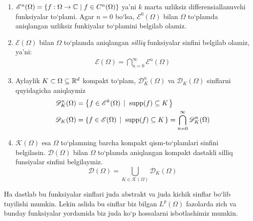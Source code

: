 \begin{enumerate}[label=\textnormal(\emph{\roman*}\textnormal)]
    \item $\mathscr{E}^n(\Omega)=\left\{f:\Omega\rightarrow \mathbb{C}\,  \left|\right. f\in C^n(\Omega)\right\}$ ya'ni $k$ marta uzliksiz differensiallanuvchi funk\-si\-yalar to`plami. Agar $n=0$ bo`lsa, $\mathscr{E}^0(\Omega)$ bilan $\Omega$ to`plamda aniqlangan uzliksiz funkiyalar to`plamini belgilab olamiz.
    \item $\mathscr{E}(\Omega)$ bilan $\Omega$ to`plamda aniqlangan \emph{silliq} funksiyalar sinfini belgilab olamiz, ya'ni:
    \begin{align}
        \mathscr{E}(\Omega)=\bigcap\limits_{n=0}^{\infty}\mathscr{E}^n(\Omega)
    \end{align}
    \item Aylaylik $K\subset \Omega\subseteq {\mathbb{R}^{d}}$ kompakt to`plam, $\mathscr{D}_K^n(\Omega)$ va $\mathscr{D}_K(\Omega)$ sinflarni quyidagicha aniq\-lay\-miz
    \begin{align}
        \mathscr{D}_K^n(\Omega)&=\left\{f\in\mathscr{E}^k(\Omega)\;  \left| \;\; \operatorname{supp}(f)\subseteq K \right. \right\}\\
        \mathscr{D}_K(\Omega)&=\left\{f\in\mathscr{E}(\Omega)\;  \left| \;\; \operatorname{supp}(f)\subseteq K \right. \right\}=\bigcap\limits_{n=0}^{\infty}\mathscr{D}_K^n(\Omega)
    \end{align}
    \item $\mathscr{K}(\Omega)$ esa $\Omega$ to`plamning barcha kompakt qism-to`plamlari sinfini belgilasin. $\mathscr{D}(\Omega)$ bilan $\Omega$ to`plamda aniqlangan kompakt dastakli silliq funsiyalar sinfini belgilaymiz.
    \begin{equation}
        \mathscr{D}(\Omega)=\bigcup\limits_{K\in\mathscr{K}(\Omega)}\mathscr{D}_K(\Omega)
    \end{equation}
\end{enumerate}
Ha dastlab bu funksiyalar sinflari juda abstrakt va juda kichik sinflar bo`lib tuyilishi mumkin. Lekin aslida bu sinflar biz bilgan $L^{p}(\Omega)$ fazolarda zich va bunday funksiyalar yordamida biz juda ko`p hossalarni isbotlashimiz mumkin. 


